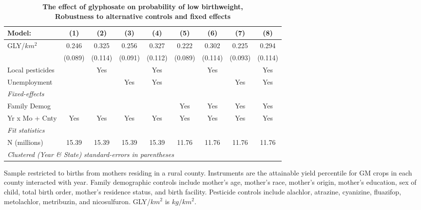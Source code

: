 \begin{table}[htbp]
   \centering
   \small
   \begin{threeparttable}[b]
      \caption{\label{tab:robust-cntrl-i_lbw-allyielddiffpercentilegmo} \textbf{The effect of glyphosate on probability of low birthweight, \\ Robustness to alternative controls and fixed effects}}
      \begin{tabular}{lcccccccc}
         \toprule
         Model:           & (1)     & (2)     & (3)     & (4)     & (5)     & (6)     & (7)     & (8)\\  
         \midrule 
         GLY/$km^2$       & 0.246   & 0.325   & 0.256   & 0.327   & 0.222   & 0.302   & 0.225   & 0.294\\   
                          & (0.089) & (0.114) & (0.091) & (0.112) & (0.089) & (0.114) & (0.093) & (0.114)\\   
         Local pesticides &         & Yes     &         & Yes     &         & Yes     &         & Yes\\  
         Unemployment     &         &         & Yes     & Yes     &         &         & Yes     & Yes\\  
         \midrule
         \emph{Fixed-effects}\\
         Family Demog     &         &         &         &         & Yes     & Yes     & Yes     & Yes\\  
         Yr x Mo + Cnty   & Yes     & Yes     & Yes     & Yes     & Yes     & Yes     & Yes     & Yes\\  
         \midrule
         \emph{Fit statistics}\\
         N (millions)     & 15.39   & 15.39   & 15.39   & 15.39   & 11.76   & 11.76   & 11.76   & 11.76\\  
         \midrule
         \multicolumn{9}{l}{\emph{Clustered (Year \& State) standard-errors in parentheses}}\\
      \end{tabular}
      
      \begin{tablenotes}\item Sample restricted to births from mothers residing in a rural county. Instruments are the attainable yield percentile for GM crops in each county interacted with year. Family demographic controls include mother's age, mother's race, mother's origin, mother's education, sex of child, total birth order, mother's residence status, and birth facility. Pesticide controls include alachlor, atrazine, cyanizine, fluazifop, metolachlor, metribuzin, and nicosulfuron. GLY/$km^2$ is $kg/km^2$.
      \end{tablenotes}
   \end{threeparttable}
\end{table}
